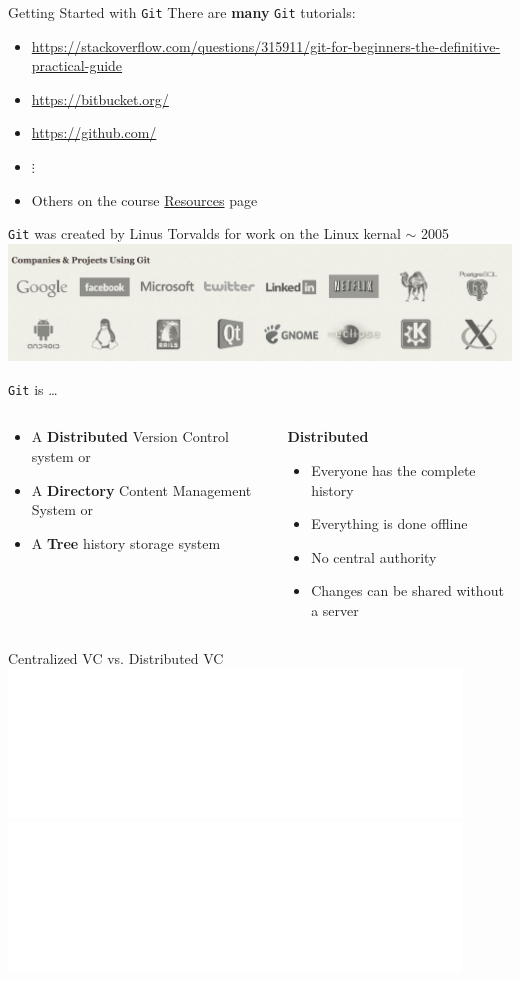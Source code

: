 \documentclass[onlymath, nologo]{beamer}
\begin{document}
  \begin{frame}{Getting Started with \texttt{Git}}
    There are \textbf{many} \texttt{Git} tutorials:
    \begin{itemize}
      \item \url{https://stackoverflow.com/questions/315911/git-for-beginners-the-definitive-practical-guide}%
      \item \url{https://bitbucket.org/} 
      \item \url{https://github.com/}
      \item \hspace{2.0em} $\vdots$
      \item Others on the course \href{https://iacs-cs-207.github.io/cs207-F17/resources.html}{Resources} page
    \end{itemize}
    \texttt{Git} was created by Linus Torvalds for work on the Linux kernal $\sim$ 2005 \\[0.5em]
    \centering
    \includegraphics[width=\textwidth]{git_companies.png}
  \end{frame}

  \begin{frame}{\texttt{Git} is \ldots}
    \begin{columns}[T]
      \begin{column}{0.5\textwidth}
        \begin{itemize}
          \item A \textbf{Distributed} Version Control system or \\[1.0em]
          \item A \textbf{Directory} Content Management System or \\[1.0em]
          \item A \textbf{Tree} history storage system
        \end{itemize}
      \end{column}
      \begin{column}{0.5\textwidth}
        \begin{center}
          \textbf{Distributed}
        \end{center}
        \begin{itemize}
          \item Everyone has the complete history
          \item Everything is done offline 
          \item No central authority 
          \item Changes can be shared without a server
        \end{itemize}
      \end{column}
    \end{columns}
  \end{frame}

  \begin{frame}{Centralized VC vs. Distributed VC}
    \centering
    \includegraphics<1>[width=0.9\textwidth]{centralized_VC.pdf}
    \includegraphics<2>[width=0.9\textwidth]{distributed_VC.pdf}
  \end{frame}
\end{document}
